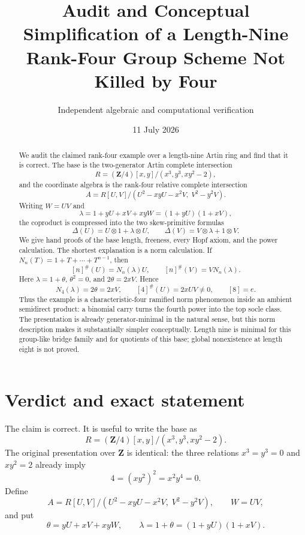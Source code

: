 \documentclass[11pt]{article}
\title{Audit and Conceptual Simplification of a Length-Nine\\
Rank-Four Group Scheme Not Killed by Four}
\author{Independent algebraic and computational verification}
\date{11 July 2026}
\theoremstyle{remark}
\newcommand{\Z}{\mathbf Z}
\newcommand{\ot}{\otimes}
\begin{document}
\maketitle

\begin{abstract}
We audit the claimed rank-four example over a length-nine Artin ring and find
that it is correct.  The base is the two-generator Artin complete intersection
\[
 R=(\Z/4)[x,y]/(x^3,y^3,xy^2-2),
\]
and the coordinate algebra is the rank-four relative complete intersection
\[
 A=R[U,V]/(U^2-xyU-x^2V,\;V^2-y^2V).
\]
Writing $W=UV$ and
\[
 \lambda=1+yU+xV+xyW=(1+yU)(1+xV),
\]
the coproduct is compressed into the two skew-primitive formulas
\[
 \Delta(U)=U\ot1+\lambda\ot U,
 \qquad
 \Delta(V)=V\ot\lambda+1\ot V.
\]
We give hand proofs of the base length, freeness, every Hopf axiom, and the
power calculation.  The shortest explanation is a norm calculation.  If
$N_n(T)=1+T+\cdots+T^{n-1}$, then
\[
 [n]^\#(U)=N_n(\lambda)U,
 \qquad [n]^\#(V)=VN_n(\lambda).
\]
Here $\lambda=1+\theta$, $\theta^2=0$, and $2\theta=2xV$.  Hence
\[
 N_4(\lambda)=2\theta=2xV,
 \qquad [4]^\#(U)=2xUV\ne0,
 \qquad [8]=e.
\]
Thus the example is a characteristic-four ramified norm phenomenon inside an
ambient semidirect product: a binomial carry turns the fourth power into the
top socle class.
The presentation is already generator-minimal in the natural sense, but this
norm description makes it substantially simpler conceptually.  Length nine
is minimal for this group-like bridge family and for quotients of this base;
global nonexistence at length eight is not proved.
\end{abstract}

\begin{center}
\end{center}
\medskip

\tableofcontents

\section{Verdict and exact statement}

The claim is correct.  It is useful to write the base as
\begin{equation}\label{eq:R}
 R=(\Z/4)[x,y]/(x^3,y^3,xy^2-2).
\end{equation}
The original presentation over $\Z$ is identical: the three relations
$x^3=y^3=0$ and $xy^2=2$ already imply
\[
 4=(xy^2)^2=x^2y^4=0.
\]
Define
\begin{equation}\label{eq:A}
 A=R[U,V]/(U^2-xyU-x^2V,\;V^2-y^2V),
 \qquad W=UV,
\end{equation}
and put
\begin{equation}\label{eq:theta-lambda}
 \theta=yU+xV+xyW,
 \qquad
 \lambda=1+\theta=(1+yU)(1+xV).
\end{equation}
\end{document}
